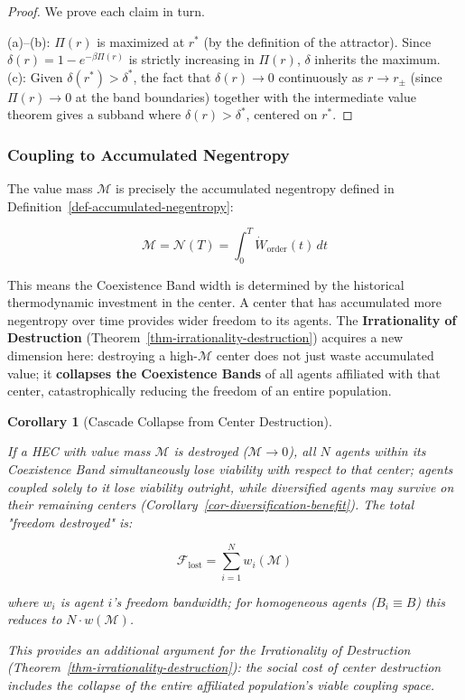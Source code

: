 \documentclass[11pt]{article}
\theoremstyle{plain}
\newtheorem{corollary}[theorem]{Corollary}
\theoremstyle{definition}
\theoremstyle{remark}
\let\origsubsubsection\subsubsection
\renewcommand{\subsubsection}{\needspace{4\baselineskip}\origsubsubsection}
\begin{document}
\begin{proof}
We prove each claim in turn.

(a)–(b): $\Pi(r)$ is maximized at $r^*$ (by the definition of the attractor). Since $\delta(r) = 1 - e^{-\beta \Pi(r)}$ is strictly increasing in $\Pi(r)$, $\delta$ inherits the maximum. (c): Given $\delta(r^*) > \delta^*$, the fact that $\delta(r) \to 0$ continuously as $r \to r_\pm$ (since $\Pi(r) \to 0$ at the band boundaries) together with the intermediate value theorem gives a subband where $\delta(r) > \delta^*$, centered on $r^*$.
\end{proof}

\subsubsection{Coupling to Accumulated
Negentropy}\label{coupling-to-accumulated-negentropy}

The value mass \(\mathcal{M}\) is precisely the accumulated negentropy
defined in Definition~\ref{def-accumulated-negentropy}:

\[\mathcal{M} = \mathcal{N}(T) = \int_0^T \dot{W}_{\text{order}}(t) \, dt\]

This means the Coexistence Band width is determined by the historical
thermodynamic investment in the center. A center that has accumulated
more negentropy over time provides wider freedom to its agents. The
\textbf{Irrationality of Destruction}
(Theorem~\ref{thm-irrationality-destruction}) acquires a new dimension
here: destroying a high-\(\mathcal{M}\) center does not just waste
accumulated value; it \textbf{collapses the Coexistence Bands} of all
agents affiliated with that center, catastrophically reducing the
freedom of an entire population.

\begin{corollary}[Cascade Collapse from Center Destruction]
\label{cor-cascade-collapse}

If a HEC with value mass $\mathcal{M}$ is destroyed ($\mathcal{M} \to 0$), all $N$ agents within its Coexistence Band simultaneously lose viability with respect to that center; agents coupled solely to it lose viability outright, while diversified agents may survive on their remaining centers (Corollary~\ref{cor-diversification-benefit}). The total "freedom destroyed" is:

$$\mathcal{F}_{\text{lost}} = \sum_{i=1}^{N} w_i(\mathcal{M})$$

where $w_i$ is agent $i$'s freedom bandwidth; for homogeneous agents ($B_i \equiv B$) this reduces to $N \cdot w(\mathcal{M})$.

This provides an additional argument for the Irrationality of Destruction (Theorem~\ref{thm-irrationality-destruction}): the social cost of center destruction includes the collapse of the entire affiliated population's viable coupling space.
\end{corollary}
\end{document}
